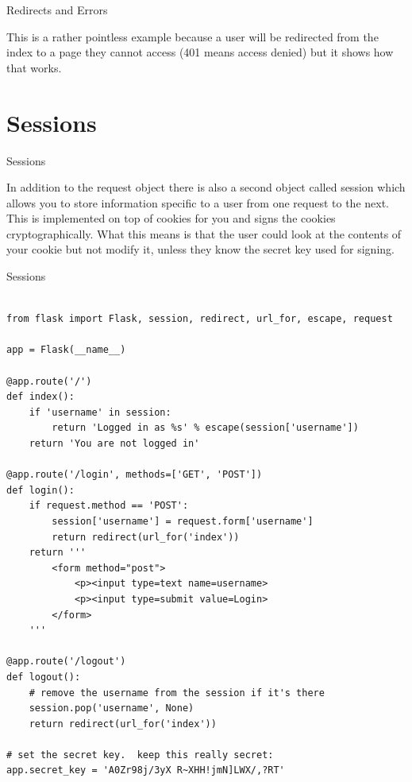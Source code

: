 \documentclass{beamer}
\begin{document}
\begin{frame}[t]{Redirects and Errors}

This is a rather pointless example because a user will be redirected from
the index to a page they cannot access (401 means access denied) but it
shows how that works.

\end{frame}

\section{Sessions}

\begin{frame}[t]{Sessions}

In addition to the request object there is also a second object called
session which allows you to store information specific to a
user from one request to the next.  This is implemented on top of cookies
for you and signs the cookies cryptographically.  What this means is that
the user could look at the contents of your cookie but not modify it,
unless they know the secret key used for signing.

\end{frame}

\begin{frame}[t,fragile]{Sessions}


\begin{verbatim}

from flask import Flask, session, redirect, url_for, escape, request

app = Flask(__name__)

@app.route('/')
def index():
    if 'username' in session:
        return 'Logged in as %s' % escape(session['username'])
    return 'You are not logged in'

@app.route('/login', methods=['GET', 'POST'])
def login():
    if request.method == 'POST':
        session['username'] = request.form['username']
        return redirect(url_for('index'))
    return '''
        <form method="post">
            <p><input type=text name=username>
            <p><input type=submit value=Login>
        </form>
    '''

@app.route('/logout')
def logout():
    # remove the username from the session if it's there
    session.pop('username', None)
    return redirect(url_for('index'))

# set the secret key.  keep this really secret:
app.secret_key = 'A0Zr98j/3yX R~XHH!jmN]LWX/,?RT'


\end{verbatim}


\end{frame}
\end{document}
